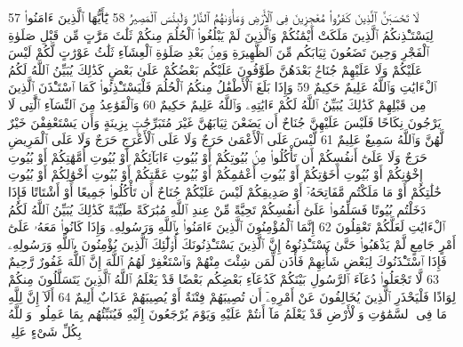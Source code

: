 {\tiny\colorbox{cl_aya}{57}} لَا تَحْسَبَنَّ ٱلَّذِينَ كَفَرُوا۟ مُعْجِزِينَ فِى ٱلْأَرْضِ وَمَأْوَىٰهُمُ ٱلنَّارُ وَلَبِئْسَ ٱلْمَصِيرُ
{\tiny\colorbox{cl_aya}{58}} يَٰٓأَيُّهَا ٱلَّذِينَ ءَامَنُوا۟ لِيَسْتَـْٔذِنكُمُ ٱلَّذِينَ مَلَكَتْ أَيْمَٰنُكُمْ وَٱلَّذِينَ لَمْ يَبْلُغُوا۟ ٱلْحُلُمَ مِنكُمْ ثَلَٰثَ مَرَّٰتٍ مِّن قَبْلِ صَلَوٰةِ ٱلْفَجْرِ وَحِينَ تَضَعُونَ ثِيَابَكُم مِّنَ ٱلظَّهِيرَةِ وَمِنۢ بَعْدِ صَلَوٰةِ ٱلْعِشَآءِ ثَلَٰثُ عَوْرَٰتٍ لَّكُمْ لَيْسَ عَلَيْكُمْ وَلَا عَلَيْهِمْ جُنَاحٌۢ بَعْدَهُنَّ طَوَّٰفُونَ عَلَيْكُم بَعْضُكُمْ عَلَىٰ بَعْضٍ كَذَٰلِكَ يُبَيِّنُ ٱللَّهُ لَكُمُ ٱلْءَايَٰتِ وَٱللَّهُ عَلِيمٌ حَكِيمٌ
{\tiny\colorbox{cl_aya}{59}} وَإِذَا بَلَغَ ٱلْأَطْفَٰلُ مِنكُمُ ٱلْحُلُمَ فَلْيَسْتَـْٔذِنُوا۟ كَمَا ٱسْتَـْٔذَنَ ٱلَّذِينَ مِن قَبْلِهِمْ كَذَٰلِكَ يُبَيِّنُ ٱللَّهُ لَكُمْ ءَايَٰتِهِۦ وَٱللَّهُ عَلِيمٌ حَكِيمٌ
{\tiny\colorbox{cl_aya}{60}} وَٱلْقَوَٰعِدُ مِنَ ٱلنِّسَآءِ ٱلَّٰتِى لَا يَرْجُونَ نِكَاحًا فَلَيْسَ عَلَيْهِنَّ جُنَاحٌ أَن يَضَعْنَ ثِيَابَهُنَّ غَيْرَ مُتَبَرِّجَٰتٍۭ بِزِينَةٍ وَأَن يَسْتَعْفِفْنَ خَيْرٌ لَّهُنَّ وَٱللَّهُ سَمِيعٌ عَلِيمٌ
{\tiny\colorbox{cl_aya}{61}} لَّيْسَ عَلَى ٱلْأَعْمَىٰ حَرَجٌ وَلَا عَلَى ٱلْأَعْرَجِ حَرَجٌ وَلَا عَلَى ٱلْمَرِيضِ حَرَجٌ وَلَا عَلَىٰٓ أَنفُسِكُمْ أَن تَأْكُلُوا۟ مِنۢ بُيُوتِكُمْ أَوْ بُيُوتِ ءَابَآئِكُمْ أَوْ بُيُوتِ أُمَّهَٰتِكُمْ أَوْ بُيُوتِ إِخْوَٰنِكُمْ أَوْ بُيُوتِ أَخَوَٰتِكُمْ أَوْ بُيُوتِ أَعْمَٰمِكُمْ أَوْ بُيُوتِ عَمَّٰتِكُمْ أَوْ بُيُوتِ أَخْوَٰلِكُمْ أَوْ بُيُوتِ خَٰلَٰتِكُمْ أَوْ مَا مَلَكْتُم مَّفَاتِحَهُۥٓ أَوْ صَدِيقِكُمْ لَيْسَ عَلَيْكُمْ جُنَاحٌ أَن تَأْكُلُوا۟ جَمِيعًا أَوْ أَشْتَاتًا فَإِذَا دَخَلْتُم بُيُوتًا فَسَلِّمُوا۟ عَلَىٰٓ أَنفُسِكُمْ تَحِيَّةً مِّنْ عِندِ ٱللَّهِ مُبَٰرَكَةً طَيِّبَةً كَذَٰلِكَ يُبَيِّنُ ٱللَّهُ لَكُمُ ٱلْءَايَٰتِ لَعَلَّكُمْ تَعْقِلُونَ
{\tiny\colorbox{cl_aya}{62}} إِنَّمَا ٱلْمُؤْمِنُونَ ٱلَّذِينَ ءَامَنُوا۟ بِٱللَّهِ وَرَسُولِهِۦ وَإِذَا كَانُوا۟ مَعَهُۥ عَلَىٰٓ أَمْرٍ جَامِعٍ لَّمْ يَذْهَبُوا۟ حَتَّىٰ يَسْتَـْٔذِنُوهُ إِنَّ ٱلَّذِينَ يَسْتَـْٔذِنُونَكَ أُو۟لَٰٓئِكَ ٱلَّذِينَ يُؤْمِنُونَ بِٱللَّهِ وَرَسُولِهِۦ فَإِذَا ٱسْتَـْٔذَنُوكَ لِبَعْضِ شَأْنِهِمْ فَأْذَن لِّمَن شِئْتَ مِنْهُمْ وَٱسْتَغْفِرْ لَهُمُ ٱللَّهَ إِنَّ ٱللَّهَ غَفُورٌ رَّحِيمٌ
{\tiny\colorbox{cl_aya}{63}} لَّا تَجْعَلُوا۟ دُعَآءَ ٱلرَّسُولِ بَيْنَكُمْ كَدُعَآءِ بَعْضِكُم بَعْضًا قَدْ يَعْلَمُ ٱللَّهُ ٱلَّذِينَ يَتَسَلَّلُونَ مِنكُمْ لِوَاذًا فَلْيَحْذَرِ ٱلَّذِينَ يُخَالِفُونَ عَنْ أَمْرِهِۦٓ أَن تُصِيبَهُمْ فِتْنَةٌ أَوْ يُصِيبَهُمْ عَذَابٌ أَلِيمٌ
{\tiny\colorbox{cl_aya}{64}} أَلَآ إِنَّ لِلَّهِ مَا فِى ٱلسَّمَٰوَٰتِ وَٱلْأَرْضِ قَدْ يَعْلَمُ مَآ أَنتُمْ عَلَيْهِ وَيَوْمَ يُرْجَعُونَ إِلَيْهِ فَيُنَبِّئُهُم بِمَا عَمِلُوا۟ وَٱللَّهُ بِكُلِّ شَىْءٍ عَلِيمٌۢ
